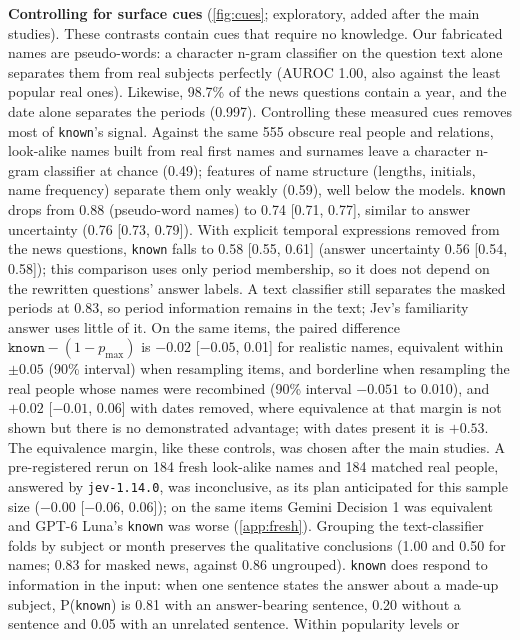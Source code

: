 \documentclass[10pt,twocolumn]{article}
\newcommand{\pmax}{p_{\max}}
\begin{document}
\textbf{Controlling for surface cues} (\cref{fig:cues}; exploratory, added
after the main studies). These contrasts contain
cues that require no knowledge. Our fabricated names are pseudo-words: a character
n-gram classifier on the question text alone separates them from real
subjects perfectly (AUROC 1.00, also against the least popular real ones).
Likewise, 98.7\% of the news questions contain a year, and the date alone
separates the periods (0.997). Controlling these measured cues removes most
of \texttt{known}'s signal. Against the same 555 obscure real people and
relations, look-alike names built from real first names and surnames leave a
character n-gram classifier at chance (0.49); features of name structure
(lengths, initials, name frequency) separate them only weakly (0.59), well
below the models. \texttt{known} drops from 0.88
(pseudo-word names) to 0.74 [0.71, 0.77], similar to answer uncertainty (0.76
[0.73, 0.79]). With explicit temporal expressions removed from the news
questions, \texttt{known} falls to 0.58 [0.55, 0.61] (answer uncertainty 0.56
[0.54, 0.58]); this comparison uses only period membership, so it does not
depend on the rewritten questions' answer labels. A text classifier still
separates the masked periods at 0.83, so period information remains in the
text; Jev's familiarity answer uses little of it. On the same
items, the paired difference $\texttt{known}-(1-\pmax)$ is $-0.02$
[$-0.05$, 0.01] for realistic names, equivalent within $\pm0.05$ (90\% interval)
when resampling items, and borderline when resampling the real people whose
names were recombined (90\% interval $-0.051$ to 0.010), and $+0.02$ [$-0.01$, 0.06] with dates removed, where equivalence at that margin
is not shown but there is no demonstrated advantage; with dates present it is
$+0.53$. The equivalence margin, like these controls, was chosen after the
main studies. A pre-registered rerun on 184 fresh look-alike names and 184
matched real people, answered by \texttt{jev-1.14.0}, was inconclusive, as
its plan anticipated for this sample size ($-0.00$ [$-0.06$, 0.06]); on the
same items Gemini Decision 1 was equivalent and GPT-6 Luna's \texttt{known}
was worse (\cref{app:fresh}). Grouping the text-classifier folds by subject or month
preserves the qualitative conclusions (1.00 and 0.50 for names; 0.83 for
masked news, against 0.86 ungrouped). \texttt{known} does respond to
information in the input: when one sentence states the answer about a made-up
subject, P(\texttt{known}) is 0.81 with an answer-bearing sentence, 0.20
without a sentence and 0.05 with an unrelated sentence. Within popularity levels or
\end{document}
